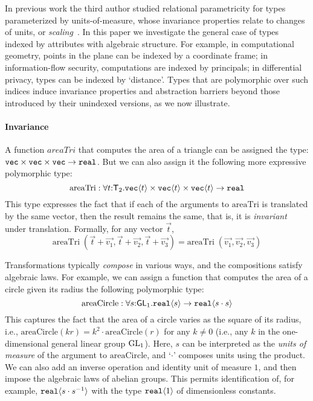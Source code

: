In previous work the third author studied relational parametricity for
types parameterized by units-of-measure, whose invariance 
properties relate to changes of units, or \emph{scaling}~\cite{kennedy97relational}. 
In this paper we investigate the general case of types indexed by attributes
with algebraic structure. For example, in computational geometry, points in
the plane can be indexed by a coordinate frame; in information-flow
security, computations are indexed by principals; in differential privacy, types
can be indexed by `distance'. Types that are
polymorphic over such indices induce invariance properties and
abstraction barriers beyond those introduced by their unindexed
versions, as we now illustrate.

\paragraph{Invariance}
A function $\mathit{areaTri}$ that computes the area of a triangle
can be assigned the type:
$\textup{\texttt{vec}}\times\textup{\texttt{vec}}\times\textup{\texttt{vec}}\to\texttt{real}$.
But we can also assign it the following more expressive polymorphic
type:
\[
\mathrm{areaTri} : \forall t\mathord:\mathsf{T}_2.
  \textup{\texttt{vec}}\langle t \rangle \times \textup{\texttt{vec}}\langle t \rangle \times \textup{\texttt{vec}}\langle t \rangle \to \texttt{real} \\
\]
This type expresses the fact that if each of the arguments to $\mathrm{areaTri}$
is translated by the same vector, then the result remains the same,
that is, it is \emph{invariant} under translation. Formally, for any 
vector $\vec t$,
\[
\mathrm{areaTri}\;(\vec{t} + \vec{v_1}, \vec{t} + \vec{v_2}, \vec{t} + \vec{v_3}) = 
\mathrm{areaTri}\;(\vec{v_1}, \vec{v_2}, \vec{v_3})
\]

Transformations typically \emph{compose} in various
ways, and the compositions satisfy algebraic laws. For example, 
we can assign a function that computes the area of a circle given its
radius the following polymorphic type:
\[
\mathrm{areaCircle} : \forall s\mathord:\mathsf{GL}_1.\textup{\texttt{real}}\langle s \rangle\to
\textup{\texttt{real}}\langle s\cdot s \rangle
\]
This captures the fact that the area of a circle varies as the square
of its radius, i.e., $\mathrm{areaCircle}(k r) = k^2\cdot
\mathrm{areaCircle}(r)$ for any $k\neq 0$ (i.e., any $k$ in the
one-dimensional general linear group $\mathrm{GL}_1$).  Here, $s$ 
can be interpreted as the \emph{units of measure} of the argument to
$\mathrm{areaCircle}$, and `$\cdot$' composes units using the
product. We can also add an inverse operation and identity unit of
measure $1$, and then impose the algebraic laws of abelian
groups. This permits identification of, for example,
$\textup{\texttt{real}}\langle s\cdot s^{-1} \rangle$ with the type
$\textup{\texttt{real}}\langle 1 \rangle$ of dimensionless constants.

